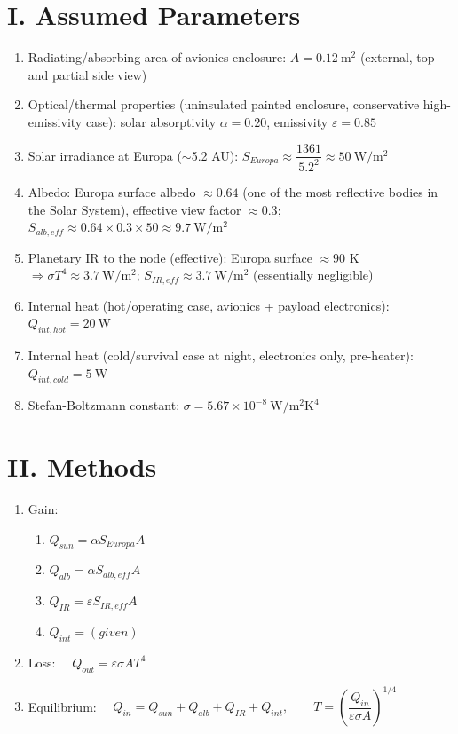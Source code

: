 \documentclass[11pt]{article}
\begin{document}
\section*{I. Assumed Parameters}
\begin{enumerate}[label=\alph*.]
  \item Radiating/absorbing area of avionics enclosure: $A = 0.12\ \mathrm{m^2}$ (external, top and partial side view)
  \item Optical/thermal properties (uninsulated painted enclosure, conservative high-emissivity case): solar absorptivity $\alpha = 0.20$, emissivity $\varepsilon = 0.85$
  \item Solar irradiance at Europa ($\sim$5.2 AU): $S_{Europa} \approx \dfrac{1361}{5.2^2} \approx 50\ \mathrm{W/m^2}$
  \item Albedo: Europa surface albedo $\approx 0.64$ (one of the most reflective bodies in the Solar System), effective view factor $\approx 0.3$; $S_{alb,eff} \approx 0.64 \times 0.3 \times 50 \approx 9.7\ \mathrm{W/m^2}$
  \item Planetary IR to the node (effective): Europa surface $\approx 90$ K $\Rightarrow \sigma T^4 \approx 3.7\ \mathrm{W/m^2}$; $S_{IR,eff} \approx 3.7\ \mathrm{W/m^2}$ (essentially negligible)
  \item Internal heat (hot/operating case, avionics + payload electronics): $Q_{int,hot} = 20\ \mathrm{W}$
  \item Internal heat (cold/survival case at night, electronics only, pre-heater): $Q_{int,cold} = 5\ \mathrm{W}$
  \item Stefan-Boltzmann constant: $\sigma = 5.67\times10^{-8}\ \mathrm{W/m^2K^4}$
\end{enumerate}

\section*{II. Methods}
\begin{enumerate}[label=\alph*.]
  \item Gain:
  \begin{enumerate}[label=\roman*.]
    \item $Q_{sun} = \alpha S_{Europa} A$
    \item $Q_{alb} = \alpha S_{alb,eff} A$
    \item $Q_{IR} = \varepsilon S_{IR,eff} A$
    \item $Q_{int} = (given)$
  \end{enumerate}
  \item Loss: $\quad Q_{out} = \varepsilon \sigma A T^4$
  \item Equilibrium: $\quad Q_{in} = Q_{sun} + Q_{alb} + Q_{IR} + Q_{int}, \qquad T = \left(\dfrac{Q_{in}}{\varepsilon \sigma A}\right)^{1/4}$
\end{enumerate}
\end{document}
